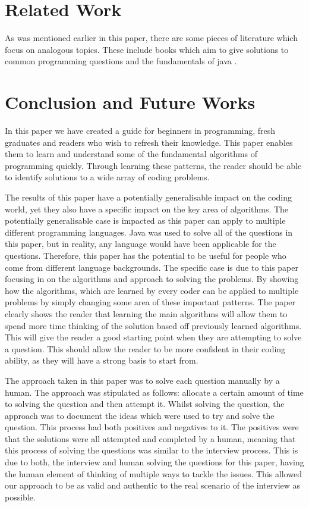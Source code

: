 \documentclass[10pt,twocolumn]{IEEEtran}
\begin{document}
\section{Related Work}
As was mentioned earlier in this paper, there are some pieces of literature which focus on analogous topics. These include books which aim to give solutions to common programming questions \cite{mcdowell2015cracking} and the fundamentals of java \cite{markham2014java}.
\section{Conclusion and Future Works}
In this paper we have created a guide for beginners in programming, fresh graduates and readers who wish to refresh their knowledge. This paper enables them to learn and understand some of the fundamental algorithms of programming quickly. Through learning these patterns, the reader should be able to identify solutions to a wide array of coding problems. 
\par The results of this paper have a potentially generalisable impact on the coding world, yet they also have a specific impact on the key area of algorithms. The potentially generalisable case is impacted as this paper can apply to multiple different programming languages. Java was used to solve all of the questions in this paper, but in reality, any language would have been applicable for the questions. Therefore, this paper has the potential to be useful for people who come from different language backgrounds. The specific case is due to this paper focusing in on the algorithms and approach to solving the problems. By showing how the algorithms, which are learned by every coder can be applied to multiple problems by simply changing some area of these important patterns. The paper clearly shows the reader that learning the main algorithms will allow them to spend more time thinking of the solution based off previously learned algorithms. This will give the reader a good starting point when they are attempting to solve a question. This should allow the reader to be more confident in their coding ability, as they will have a strong basis to start from. 
\par The approach taken in this paper was to solve each question manually by a human. The approach was stipulated as follows: allocate a certain amount of time to solving the question and then attempt it. Whilst solving the question, the approach was to document the ideas which were used to try and solve the question.  This process had both positives and negatives to it. The positives were that the solutions were all attempted and completed by a human, meaning that this process of solving the questions was similar to the interview process. This is due to both, the interview and human solving the questions for this paper, having the human element of thinking of multiple ways to tackle the issues. This allowed our approach to be as valid and authentic to the real scenario of the interview as possible.
\end{document}
